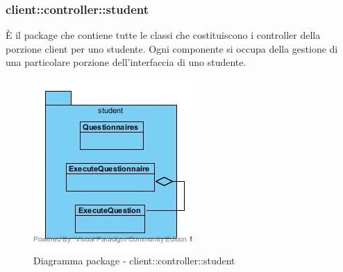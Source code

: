 \subsubsection{client::controller::student}
È il package che contiene tutte le classi che costituiscono i controller della porzione client per uno studente. Ogni componente si occupa della gestione di una particolare porzione dell'interfaccia di uno studente.\begin{center}
	\begin{figure}[H]
		\centering \includegraphics[scale=4, max width=\textwidth, max height=\myheight]{../img/diagrammiClassi/client/controller/student.png}
		\caption{Diagramma package - client::controller::student}
	\end{figure}
\end{center}\hypertarget{client::controller::student::Questionnaires}{}
